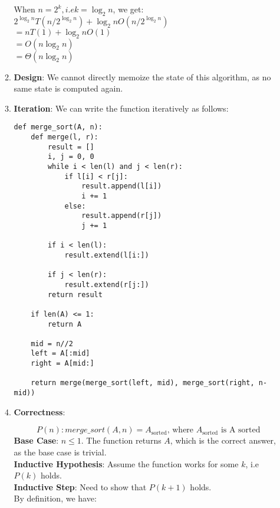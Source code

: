 \documentclass[a4paper]{article}
\begin{document}
\begin{enumerate}
\begin{enumerate}[label=\roman*]
When $n = 2^k, i.e k = \log_2 n$, we get:\\
$2^{\log_2 n} T(n/2^{\log_2 n}) + \log_2 n O(n/2^{\log_2 n})$\\
$= nT(1) + \log_2 n O(1)$\\
$= O(n \log_2 n)$\\
$= \Theta(n \log_2 n)$

\item \textbf{Design}: We cannot directly memoize the state of this algorithm, as no same state is computed again.

\item \textbf{Iteration}: We can write the function iteratively as follows:
\begin{verbatim}
def merge_sort(A, n):
    def merge(l, r):
        result = []
        i, j = 0, 0
        while i < len(l) and j < len(r):
            if l[i] < r[j]:
                result.append(l[i])
                i += 1
            else:
                result.append(r[j])
                j += 1

        if i < len(l):
            result.extend(l[i:])

        if j < len(r):
            result.extend(r[j:])
        return result

    if len(A) <= 1:
        return A

    mid = n//2
    left = A[:mid]
    right = A[mid:]

    return merge(merge_sort(left, mid), merge_sort(right, n-mid))
\end{verbatim}

\item \textbf{Correctness}:

$$P(n): merge\_sort(A, n) = A_{\text{sorted}} \text{, where } A_{\text{sorted}} \text{ is A sorted}$$
\textbf{Base Case}: $n \leq 1$. The function returns $A$, which is the correct answer, as the base case is trivial. \\
\textbf{Inductive Hypothesis}: Assume the function works for some $k$, i.e $P(k)$ holds.\\
\textbf{Inductive Step}: Need to show that $P(k+1)$ holds.\\
By definition, we have:


\end{enumerate}
\end{enumerate}
\end{document}
